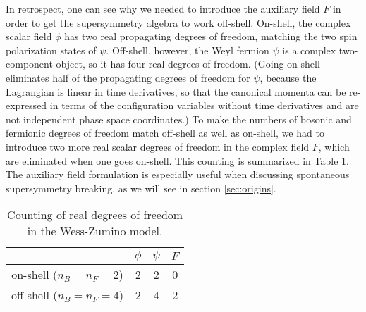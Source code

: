 \documentclass[11pt]{article}
\begin{document}
In retrospect, one can see why we needed to introduce the auxiliary field
$F$ in order to get the supersymmetry algebra to work off-shell. On-shell,
the complex scalar field $\phi$ has two real propagating degrees of
freedom, matching the two spin polarization states of $\psi$. Off-shell,
however, the Weyl fermion $\psi$ is a complex two-component object, so it
has four real degrees of freedom. (Going on-shell eliminates half of the
propagating degrees of freedom for $\psi$, because the Lagrangian is
linear in time derivatives, so that the canonical momenta can be
re-expressed in terms of the configuration variables without time
derivatives and are not independent phase space coordinates.) To make the
numbers of bosonic and fermionic degrees of freedom match off-shell as
well as on-shell, we had to introduce two more real scalar degrees of
freedom in the complex field $F$, which are eliminated when one goes
on-shell. This counting is summarized in Table \ref{table:WZdofcounting}. 
The auxiliary field formulation is especially useful when discussing
spontaneous supersymmetry breaking, as we will see in section
\ref{sec:origins}. 
\renewcommand{\arraystretch}{1.4}
\begin{table}[tb]
\begin{center}
\begin{tabular}{|c|c|c|c|}
\hline
 & $\phi$ & $\psi$ & $F$ \\
\hline
on-shell ($n_B=n_F=2$) & 2 & 2 & 0 \\
\hline
off-shell ($n_B=n_F=4$) & 2 & 4 & 2 \\
\hline
\end{tabular}
\caption{Counting of real degrees of freedom in the
Wess-Zumino model.\label{table:WZdofcounting}}
\vspace{-0.45cm}
\end{center}
\end{table}
\end{document}
